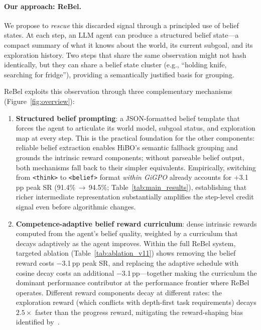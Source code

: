 \documentclass{article}
\begin{document}
\paragraph{Our approach: ReBel.}
We propose to \emph{rescue} this discarded signal through a principled use of
belief states.
At each step, an LLM agent can produce a structured belief state---a compact
summary of what it knows about the world, its current subgoal, and its
exploration history.
Two steps that share the same observation might not hash identically, but they
can share a belief state cluster (e.g., ``holding knife, searching for fridge''),
providing a semantically justified basis for grouping.

ReBel exploits this observation through three complementary mechanisms (Figure~\ref{fig:overview}):

\begin{enumerate}[leftmargin=1.5em,itemsep=3pt]
  \item \textbf{Structured belief prompting}: a JSON-formatted belief template
    that forces the agent to articulate its world model, subgoal status, and
    exploration map at every step.
    This is the practical foundation for the other components: reliable
    belief extraction enables HiBO's semantic fallback grouping and grounds
    the intrinsic reward components; without parseable belief output, both
    mechanisms fall back to their simpler equivalents.
    Empirically, switching from \texttt{<think>} to \texttt{<belief>} format
    \emph{within GiGPO} already accounts for $+$3.1\,pp peak SR
    (91.4\%\,$\to$\,94.5\%; Table~\ref{tab:main_results}), establishing that
    richer intermediate representation substantially amplifies the step-level
    credit signal even before algorithmic changes.

  \item \textbf{Competence-adaptive belief reward curriculum}: dense intrinsic
    rewards computed from the agent's belief quality, weighted by a curriculum
    that decays adaptively as the agent improves.
    Within the full ReBel system, targeted ablation (Table~\ref{tab:ablation_v11})
    shows removing the belief reward costs $-$3.1\,pp peak SR, and
    replacing the adaptive schedule with cosine decay costs an additional
    $-$3.1\,pp---together making the curriculum the dominant performance
    contributor at the performance frontier where ReBel operates.
    Different reward components decay at different rates:
    the exploration reward (which conflicts with depth-first task requirements)
    decays $2.5\times$ faster than the progress reward,
    mitigating the reward-shaping bias identified by~\citet{ng1999policy}.


\end{enumerate}
\end{document}
